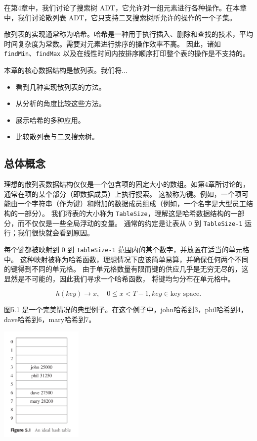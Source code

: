 \documentclass[a4paper]{ctexart}
\theoremstyle{definition}
\theoremstyle{definition}
\begin{document}
在第4章中，我们讨论了搜索树 ADT，它允许对一组元素进行各种操作。在本章中，我们讨论散列表 ADT，它只支持二叉搜索树所允许的操作的一个子集。

散列表的实现通常称为哈希。哈希是一种用于执行插入、删除和查找的技术，平均时间复杂度为常数。需要对元素进行排序的操作效率不高。
因此，诸如 \verb|findMin|、\verb|findMax| 以及在线性时间内按排序顺序打印整个表的操作是不支持的。

本章的核心数据结构是散列表。我们将...

\begin{itemize}
    \item 看到几种实现散列表的方法。
    \item 从分析的角度比较这些方法。
    \item 展示哈希的多种应用。
    \item 比较散列表与二叉搜索树。
\end{itemize}

\subsection{总体概念}

理想的散列表数据结构仅仅是一个包含项的固定大小的数组。如第4章所讨论的，通常在项的某个部分（即数据成员）上执行搜索。
这被称为键。例如，一个项可能由一个字符串（作为键）和附加的数据成员组成（例如，一个名字是大型员工结构的一部分）。
我们将表的大小称为 \texttt{TableSize}，理解这是哈希数据结构的一部分，而不仅仅是一些全局浮动的变量。
通常的约定是让表从 0 到 \texttt{TableSize-1} 运行；我们很快就会看到原因。

每个键都被映射到 0 到 \texttt{TableSize-1} 范围内的某个数字，并放置在适当的单元格中。
这种映射被称为哈希函数，理想情况下应该简单易算，并确保任何两个不同的键得到不同的单元格。
由于单元格数量有限而键的供应几乎是无穷无尽的，这显然是不可能的，因此我们寻求一个哈希函数，
将键均匀分布在单元格中。

$$
h(key) \to x, \quad 0 \leq x < T - 1, key \in \text{key space}.
$$

图5.1 是一个完美情况的典型例子。在这个例子中，john哈希到3，phil哈希到4，dave哈希到6，mary哈希到7。

\begin{center}
    \includegraphics[width=0.3\textwidth]{images/hash_example.png}
\end{center}
\end{document}
